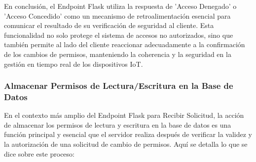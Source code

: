 \documentclass{report}
\begin{document}
En conclusión, el Endpoint Flask utiliza la respuesta de 'Acceso Denegado' o 'Acceso Concedido' como un mecanismo de retroalimentación 
esencial para comunicar el resultado de su verificación de seguridad al cliente. Esta funcionalidad no solo protege el sistema de accesos 
no autorizados, sino que también permite al lado del cliente reaccionar adecuadamente a la confirmación de los cambios de permisos, 
manteniendo la coherencia y la seguridad en la gestión en tiempo real de los dispositivos IoT.

\subsubsection{Almacenar Permisos de Lectura/Escritura en la Base de Datos}
En el contexto más amplio del Endpoint Flask para Recibir Solicitud, la acción de almacenar los permisos de lectura y escritura 
en la base de datos es una función principal y esencial que el servidor realiza después de verificar la validez y la autorización 
de una solicitud de cambio de permisos.
Aquí se detalla lo que se dice sobre este proceso:
\end{document}
